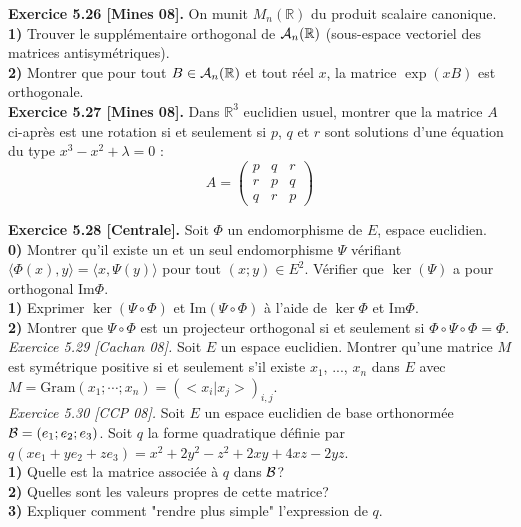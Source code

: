 \documentclass[a4paper,12pt,francais]{article}
\newcommand{\field}[1]{\mathbb{#1}}
\newcommand{\R}{\field{R}}
\newcommand{\im}{\mbox{Im}}
\begin{document}
 \noindent
 {\bf Exercice 5.26 [Mines 08].} On munit $M_n(\R)$ du produit scalaire canonique.\\
 {\bf 1)} Trouver le supplémentaire orthogonal de ${\cal{A}}_n(\R)$ (sous-espace vectoriel des matrices antisymétriques).\\
 {\bf 2)} Montrer que pour tout $B \in {\cal{A}}_n(\R)$ et tout réel $x$, la matrice $\exp(xB)$ est orthogonale.\\
 
 \noindent
 {\bf Exercice 5.27 [Mines 08].} Dans $\R^3$ euclidien usuel, montrer que la matrice $A$ ci-après est une rotation si et seulement si $p$, $q$ et $r$ sont solutions d'une équation du type $x^3-x^2+\lambda=0$ :\\
  $$A=\left( {\begin{array}{ccc}
  p&q&r\\
  r&p&q\\
  q&r&p
  \end{array} }\right)$$
  
\noindent
{\bf Exercice 5.28 [Centrale].} Soit $\Phi$ un endomorphisme de $E$, espace euclidien.\\
{\bf 0)} Montrer qu'il existe un et un seul endomorphisme $\Psi$ vérifiant $\langle \Phi(x),y\rangle= \langle x,\Psi(y) \rangle$ pour tout $(x;y)\in E^2$. Vérifier que $\ker(\Psi)$ a pour orthogonal $\im \Phi$.\\
{\bf 1)} Exprimer $\ker (\Psi \circ \Phi)$ et $\im (\Psi \circ \Phi)$ à l'aide de $\ker \Phi$ et $\im \Phi$.\\
{\bf 2)} Montrer que $\Psi \circ \Phi$ est un projecteur orthogonal si et seulement si $\Phi \circ \Psi \circ \Phi =\Phi$.\\

\noindent
{\it Exercice 5.29 [Cachan 08].} Soit $E$ un espace euclidien. Montrer qu'une matrice $M$ est symétrique positive si et seulement s'il existe $x_1$, ..., $x_n$ dans $E$ avec $M=\mbox{Gram}(x_1;\cdots; x_n)=(<x_i|x_j>)_{i,j}$.\\

\noindent
{\it Exercice 5.30 [CCP 08].} Soit $E$ un espace euclidien de base orthonormée ${\cal{B}}=(e_1;e_2;e_3)$. Soit $q$ la forme quadratique définie par $q(xe_1+ye_2+ze_3)=x^2+2y^2-z^2+2xy+4xz-2yz$.\\
\indent
{\bf 1)} Quelle est la matrice associée à $q$ dans $\cal{B}$?\\
\indent
{\bf 2)} Quelles sont les valeurs propres de cette matrice?\\
\indent
{\bf 3)} Expliquer comment "rendre plus simple" l'expression de $q$.\\
\end{document}
